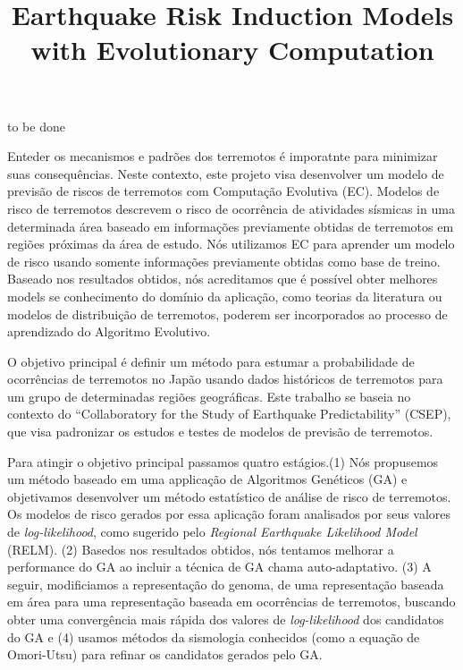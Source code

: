 \documentclass[bacharelado]{unb-cic}
\title{Earthquake Risk Induction Models with Evolutionary Computation}
\begin{document}
  \maketitle
  \pretextual

  \begin{agradecimentos}
  to be done
  \end{agradecimentos}
  \begin{resumo}
  Enteder os mecanismos e padrões dos terremotos é imporatnte para minimizar suas consequências. Neste contexto, este projeto visa desenvolver um modelo de previsão de riscos de terremotos com Computação Evolutiva (EC). Modelos de risco de terremotos descrevem o risco de ocorrência de atividades sísmicas in uma determinada área baseado em informações previamente obtidas de terremotos em regiões próximas da área de estudo. Nós utilizamos EC para aprender um modelo de risco usando somente informações previamente obtidas como base de treino. Baseado nos resultados obtidos, nós acreditamos que é possível obter melhores models se conhecimento do domínio da aplicação, como teorias da literatura ou modelos de distribuição de terremotos, poderem ser incorporados ao processo de aprendizado do Algoritmo Evolutivo.

  O objetivo principal é definir um método para estumar a probabilidade de ocorrências de terremotos no Japão usando dados históricos de terremotos para um grupo de determinadas regiões geográficas. Este trabalho se baseia no contexto do  “Collaboratory for the Study of Earthquake Predictability” (CSEP), que visa padronizar os estudos e testes de modelos de previsão de terremotos. 
  
  Para atingir o objetivo principal passamos quatro estágios.(1) Nós propusemos um método baseado em uma applicação de Algoritmos Genéticos (GA) e objetivamos desenvolver um método estatístico de análise de risco de terremotos. Os modelos de risco gerados por essa aplicação foram analisados por seus valores de \textit{log-likelihood}, como sugerido pelo \textit{Regional Earthquake Likelihood Model} (RELM). (2) Basedos nos resultados obtidos, nós tentamos melhorar a performance do GA ao incluir a técnica de GA chama auto-adaptativo. (3) A seguir, modificiamos a representação do genoma, de uma representação baseada em área para uma representação baseada em ocorrências de terremotos, buscando obter uma convergência mais rápida dos valores de \textit{log-likelihood} dos candidatos do GA e (4) usamos métodos da sismologia conhecidos (como a equação de Omori-Utsu) para refinar os candidatos gerados pelo GA.
  

\end{resumo}
\end{document}
